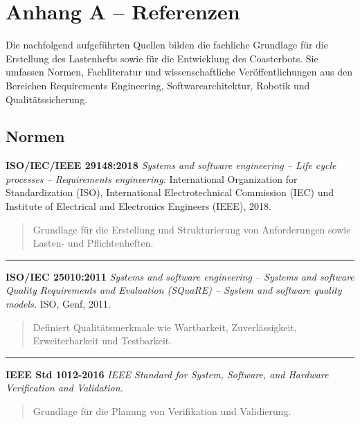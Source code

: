 \section{Anhang A -- Referenzen}\label{anhang-a-referenzen}

Die nachfolgend aufgeführten Quellen bilden die fachliche Grundlage für
die Erstellung des Lastenhefts sowie für die Entwicklung des
Coasterbots. Sie umfassen Normen, Fachliteratur und wissenschaftliche
Veröffentlichungen aus den Bereichen Requirements Engineering,
Softwarearchitektur, Robotik und Qualitätssicherung.

\subsection{Normen}\label{normen}

\textbf{ISO/IEC/IEEE 29148:2018} \emph{Systems and software engineering
-- Life cycle processes -- Requirements engineering.} International
Organization for Standardization (ISO), International Electrotechnical
Commission (IEC) und Institute of Electrical and Electronics Engineers
(IEEE), 2018.

\begin{quote}
Grundlage für die Erstellung und Strukturierung von Anforderungen sowie
Lasten- und Pflichtenheften.
\end{quote}

\begin{center}\rule{0.5\linewidth}{0.5pt}\end{center}

\textbf{ISO/IEC 25010:2011} \emph{Systems and software engineering --
Systems and software Quality Requirements and Evaluation (SQuaRE) --
System and software quality models.} ISO, Genf, 2011.

\begin{quote}
Definiert Qualitätsmerkmale wie Wartbarkeit, Zuverlässigkeit,
Erweiterbarkeit und Testbarkeit.
\end{quote}

\begin{center}\rule{0.5\linewidth}{0.5pt}\end{center}

\textbf{IEEE Std 1012-2016} \emph{IEEE Standard for System, Software,
and Hardware Verification and Validation.}

\begin{quote}
Grundlage für die Planung von Verifikation und Validierung.
\end{quote}

